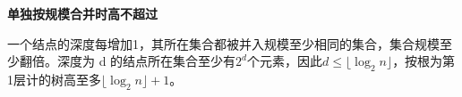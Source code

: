 {\color{ink}\bfseries 单独按规模合并时高不超过}\par\vspace{1bp}一个结点的深度每增加1，其所在集合都被并入规模至少相同的集合，集合规模至少翻倍。深度为 d 的结点所在集合至少有\(2^{d}\)个元素，因此\(d\le \lfloor \operatorname{log}_{2}n\rfloor \)，按根为第1层计的树高至多\(\lfloor \operatorname{log}_{2}n\rfloor +\allowbreak{}1\)。
